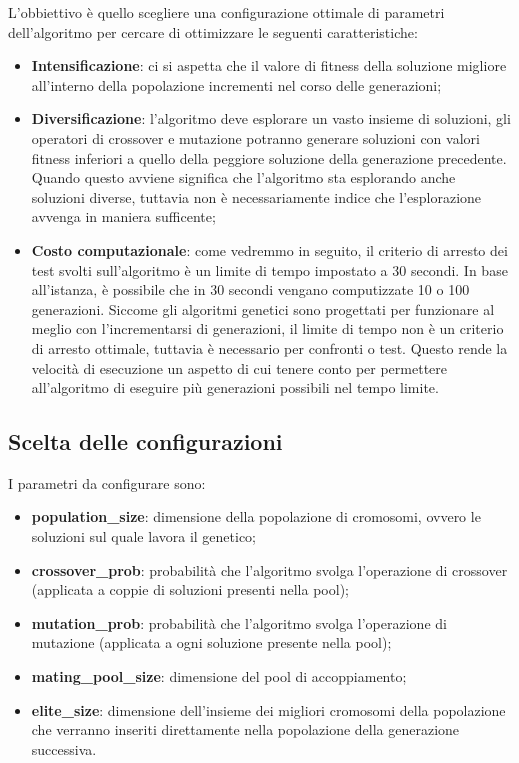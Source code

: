 L'obbiettivo è quello scegliere una configurazione ottimale di parametri dell'algoritmo per cercare di ottimizzare le seguenti caratteristiche:
\begin{itemize}
	\item\textbf{Intensificazione}: ci si aspetta che il valore di fitness della soluzione migliore all'interno della popolazione incrementi nel corso delle generazioni;
	\item\textbf{Diversificazione}: l'algoritmo deve esplorare un vasto insieme di soluzioni, gli operatori di crossover e mutazione potranno generare soluzioni con valori fitness inferiori a quello della peggiore soluzione della generazione precedente. Quando questo avviene significa che l'algoritmo sta esplorando anche soluzioni diverse, tuttavia non è necessariamente indice che l'esplorazione avvenga in maniera sufficente;
	\item\textbf{Costo computazionale}: come vedremmo in seguito, il criterio di arresto dei test svolti sull'algoritmo è un limite di tempo impostato a 30 secondi. In base all'istanza, è possibile che in 30 secondi vengano computizzate 10 o 100 generazioni. Siccome gli algoritmi genetici sono progettati per funzionare al meglio con l'incrementarsi di generazioni, il limite di tempo non è un criterio di arresto ottimale, tuttavia è necessario per confronti o test. Questo rende la velocità di esecuzione un aspetto di cui tenere conto per permettere all'algoritmo di eseguire più generazioni possibili nel tempo limite.
\end{itemize}

\subsection{Scelta delle configurazioni}

I parametri da configurare sono:
\begin{itemize}
	\item\textbf{population\_size}: dimensione della popolazione di cromosomi, ovvero le soluzioni sul quale lavora il genetico;
	\item\textbf{crossover\_prob}: probabilità che l'algoritmo svolga l'operazione di crossover (applicata a coppie di soluzioni presenti nella pool);
	\item\textbf{mutation\_prob}: probabilità che l'algoritmo svolga l'operazione di mutazione (applicata a ogni soluzione presente nella pool);
	\item\textbf{mating\_pool\_size}: dimensione del pool di accoppiamento;
	\item\textbf{elite\_size}: dimensione dell'insieme dei migliori cromosomi della popolazione che verranno inseriti direttamente nella popolazione della generazione successiva.
\end{itemize}


